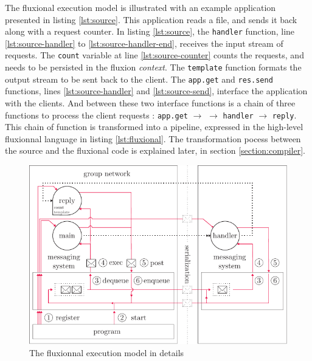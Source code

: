 The fluxional execution model is illustrated with an example application presented in listing \ref{lst:source}.
This application reads a file, and sends it back along with a request counter.
In listing \ref{lst:source}, the \texttt{handler} function, line \ref{lst:source-handler} to \ref{lst:source-handler-end}, receives the input stream of requests.
The \texttt{count} variable at line \ref{lst:source-counter} counts the requests, and needs to be persisted in the fluxion \textit{context}.
The \texttt{template} function formats the output stream to be sent back to the client.
The \texttt{app.get} and \texttt{res.send} functions, lines \ref{lst:source-handler} and \ref{lst:source-send}, interface the application with the clients.
And between these two interface functions is a chain of three functions to process the client requests : \texttt{app.get} $\to$ \hspace{-1.4em} $\to$ \texttt{handler} $\to$ \texttt{reply}.
This chain of function is transformed into a pipeline, expressed in the high-level fluxionnal language in listing \ref{lst:fluxional}.
The transformation pocess between the source and the fluxional code is explained later, in section \ref{section:compiler}.

\begin{figure}[h!]
  \includegraphics[width=\linewidth]{ressources/schema-message.pdf}
  \caption{The fluxionnal execution model in details}
  \label{fig:MesSys}
\end{figure}

